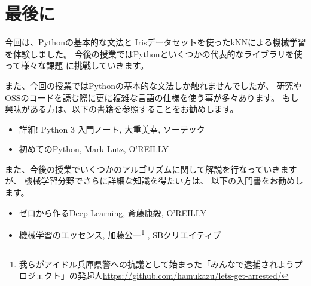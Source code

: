 \chapter{最後に}
	今回は、Pythonの基本的な文法と
	Irisデータセットを使ったkNNによる機械学習を体験しました。
	今後の授業ではPythonといくつかの代表的なライブラリを使って様々な課題
	に挑戦していきます。
	
	また、今回の授業ではPythonの基本的な文法しか触れませんでしたが、
	研究やOSSのコードを読む際に更に複雑な言語の仕様を使う事が多々あります。
	もし興味がある方は、以下の書籍を参照することをお勧めします。
	
	\begin{itemize}
		\item 詳細! Python 3 入門ノート, 大重美幸, ソーテック
		\item 初めてのPython, Mark Lutz, O'REILLY
	\end{itemize}
	
	また、今後の授業でいくつかのアルゴリズムに関して解説を行なっていきますが、
	機械学習分野でさらに詳細な知識を得たい方は、
	以下の入門書をお勧めします。
	
	\begin{itemize}
		\item ゼロから作るDeep Learning, 斎藤康毅, O'REILLY
		\item 機械学習のエッセンス, 加藤公一\footnote{我らがアイドル兵庫県警への抗議として始まった「みんなで逮捕されようプロジェクト」の発起人\url{https://github.com/hamukazu/lets-get-arrested/}} , SBクリエイティブ
	\end{itemize}

